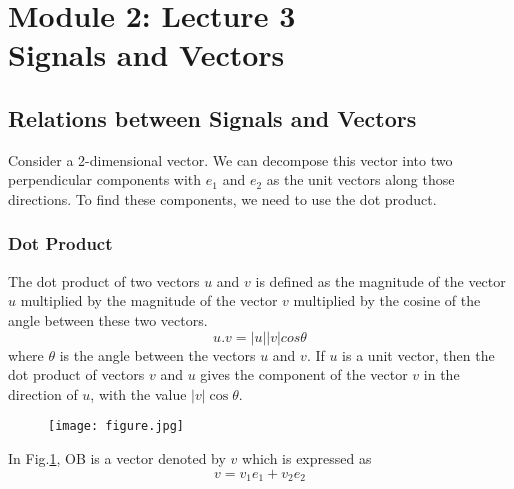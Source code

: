 \section{Module 2: Lecture 3\\Signals and Vectors}


\subsection{Relations between Signals and Vectors}
Consider a 2-dimensional vector. We can decompose this vector into two perpendicular components with $e_1$ and $e_2$ as the unit vectors along those directions. To find these components, we need to use the dot product.
\subsubsection{Dot Product}
	The dot product of two vectors $u$ and $v$ is defined as the magnitude of the vector $u$ multiplied by the magnitude of the vector $v$ multiplied by the cosine of the angle between these two vectors.
    \begin{equation*}u.v = |u||v|cos\theta\end{equation*}
  where $\theta$ is the angle between the vectors $u$ and $v$. If $u$ is a unit vector, then the dot product of vectors $v$ and $u$ gives the component of the vector $v$ in the direction of $u$, with the value $|v|\cos \theta$.
	\begin{figure}[ht]\label{fig:vector-decomposition}
    \centering
    \texttt{[image: figure.jpg]}
  \end{figure} 
  In Fig.\ref{fig:vector-decomposition}, OB is a vector denoted by $v$ which is expressed as
    \begin{equation*}v = v_1e_1 + v_2e_2\end{equation*}
    
